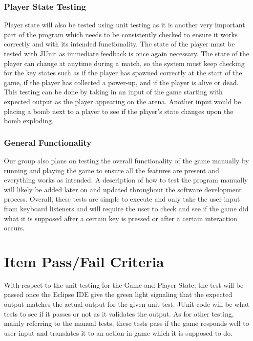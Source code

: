 \documentclass[12pt, letterpaper]{article}
\begin{document}
	\subsubsection{Player State Testing}
	\indent \indent Player state will also be tested using unit testing as it is another very important part of the program which needs to be consistently checked to ensure it works correctly and with its intended functionality. The state of the player must be tested with JUnit as immediate feedback is once again necessary. The state of the player can change at anytime during a match, so the system must keep checking for the key states such as if the player has spawned correctly at the start of the game, if the player has collected a power-up, and if the player is alive or dead. This testing can be done by taking in an input of the game starting with expected output as the player appearing on the arena. Another input would be placing a bomb next to a player to see if the player's state changes upon the bomb exploding.
	
	\subsubsection{General Functionality}
	\indent \indent Our group also plans on testing the overall functionality of the game manually by running and playing the game to ensure all the features are present and everything works as intended. A description of how to test the program manually will likely be added later on and updated throughout the software development process. Overall, these tests are simple to execute and only take the user input from keyboard listeners and will require the user to check and see if the game did what it is supposed after a certain key is pressed or after a certain interaction occurs.
	
	\section{Item Pass/Fail Criteria}
	\indent \indent With respect to the unit testing for the Game and Player State, the test will be passed once the Eclipse IDE give the green light signaling that the expected output matches the actual output for the given unit test. JUnit code will be what tests to see if it passes or not as it validates the output. As for other testing, mainly referring to the manual tests, these tests pass if the game responds well to user input and translates it to an action in game which it is supposed to do.
	
\end{document}
